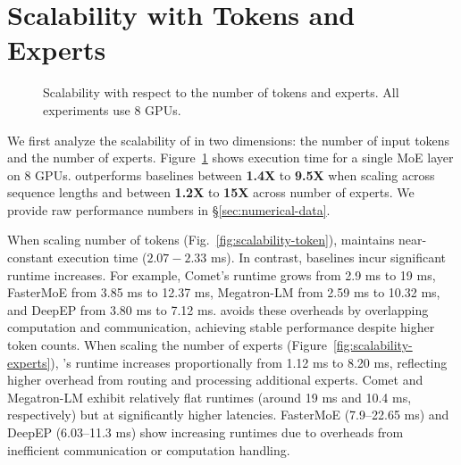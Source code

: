 \section{Scalability with Tokens and Experts}\label{subsec:scalability-with-tokens-and-experts}
\begin{figure}[h!]
    \centering
    \caption{Scalability with respect to the number of tokens and experts. All experiments use 8 GPUs.}
    \label{fig:scalability-token-experts}
\end{figure}
We first analyze the scalability of \sysname in two dimensions: the number of input tokens and the number of experts.
Figure~\ref{fig:scalability-token-experts} shows execution time for a single MoE layer on 8 GPUs.
\sysname outperforms baselines between \textbf{1.4X} to \textbf{9.5X} when scaling across sequence lengths and
between \textbf{1.2X} to \textbf{15X} across number of experts.
We provide raw performance numbers in \S\ref{sec:numerical-data}.

When scaling number of tokens (Fig.~\ref{fig:scalability-token}),
\sysname maintains near-constant execution time ($2.07-2.33$ ms).
In contrast, baselines incur significant runtime increases.
For example, Comet's runtime grows from 2.9 ms to 19 ms,
FasterMoE from 3.85 ms to 12.37 ms, Megatron-LM from 2.59 ms to 10.32 ms,
and DeepEP from 3.80 ms to 7.12 ms. \sysname avoids these overheads by overlapping computation and communication,
achieving stable performance despite higher token counts.
When scaling the number of experts (Figure~\ref{fig:scalability-experts}),
\sysname's runtime increases proportionally from 1.12 ms to 8.20 ms,
reflecting higher overhead from routing and processing additional experts.
Comet and Megatron-LM exhibit relatively flat runtimes (around 19 ms and 10.4 ms, respectively)
but at significantly higher latencies.
FasterMoE (7.9–22.65 ms) and DeepEP (6.03–11.3 ms)
show increasing runtimes due to overheads from inefficient communication or computation handling.
